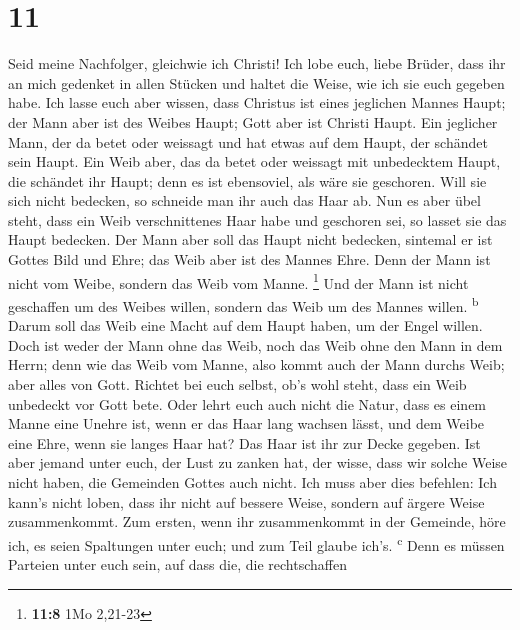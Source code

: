 \hypertarget{section-10}{%
\section{11}\label{section-10}}

 Seid meine Nachfolger, gleichwie ich Christi!
 Ich lobe euch, liebe Brüder, dass ihr an mich gedenket in
allen Stücken und haltet die Weise, wie ich sie euch gegeben habe.
 Ich lasse euch aber wissen, dass Christus ist eines
jeglichen Mannes Haupt; der Mann aber ist des Weibes Haupt; Gott aber
ist Christi Haupt.  Ein jeglicher Mann, der da betet oder
weissagt und hat etwas auf dem Haupt, der schändet sein Haupt.
 Ein Weib aber, das da betet oder weissagt mit unbedecktem
Haupt, die schändet ihr Haupt; denn es ist ebensoviel, als wäre sie
geschoren.  Will sie sich nicht bedecken, so schneide man
ihr auch das Haar ab. Nun es aber übel steht, dass ein Weib
verschnittenes Haar habe und geschoren sei, so lasset sie das Haupt
bedecken.  Der Mann aber soll das Haupt nicht bedecken,
sintemal er ist Gottes Bild und Ehre; das Weib aber ist des Mannes Ehre.
 Denn der Mann ist nicht vom Weibe, sondern das Weib vom
Manne. \footnote{\textbf{11:8} 1Mo 2,21-23}  Und der Mann
ist nicht geschaffen um des Weibes willen, sondern das Weib um des
Mannes willen. \textsuperscript{b}  Darum soll das Weib
eine Macht auf dem Haupt haben, um der Engel willen. 
Doch ist weder der Mann ohne das Weib, noch das Weib ohne den Mann in
dem Herrn;  denn wie das Weib vom Manne, also kommt auch
der Mann durchs Weib; aber alles von Gott.  Richtet bei
euch selbst, ob's wohl steht, dass ein Weib unbedeckt vor Gott bete.
 Oder lehrt euch auch nicht die Natur, dass es einem
Manne eine Unehre ist, wenn er das Haar lang wachsen lässt,
 und dem Weibe eine Ehre, wenn sie langes Haar hat? Das
Haar ist ihr zur Decke gegeben.  Ist aber jemand unter
euch, der Lust zu zanken hat, der wisse, dass wir solche Weise nicht
haben, die Gemeinden Gottes auch nicht.  Ich muss aber
dies befehlen: Ich kann's nicht loben, dass ihr nicht auf bessere Weise,
sondern auf ärgere Weise zusammenkommt.  Zum ersten, wenn
ihr zusammenkommt in der Gemeinde, höre ich, es seien Spaltungen unter
euch; und zum Teil glaube ich's. \textsuperscript{c} 
Denn es müssen Parteien unter euch sein, auf dass die, die rechtschaffen

